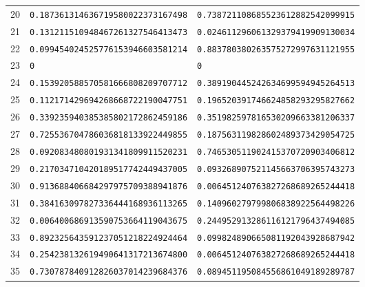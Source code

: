 \begin{center}
\begin{tabular}{@{}rll@{}}
20 & \texttt{0.187361314636719580022373167498} & \texttt{0.738721108685523612882542099915}\\
21 & \texttt{0.131211510948467261327546413473} & \texttt{0.024611296061329379419909130034}\\
22 & \texttt{0.099454024525776153946603581214} & \texttt{0.883780380263575272997631121955}\\
23 & \texttt{0} & \texttt{0}\\
24 & \texttt{0.153920588570581666808209707712} & \texttt{0.389190445242634699594945264513}\\
25 & \texttt{0.112171429694268668722190047751} & \texttt{0.196520391746624858293295827662}\\
26 & \texttt{0.339235940385385802172862459186} & \texttt{0.351982597816530209663381206337}\\
27 & \texttt{0.725536704786036818133922449855} & \texttt{0.187563119828602489373429054725}\\
28 & \texttt{0.092083480801931341809911520231} & \texttt{0.746530511902415370720903406812}\\
29 & \texttt{0.217034710420189517742449437005} & \texttt{0.093268907521145663706395743273}\\
30 & \texttt{0.913688406684297975709388941876} & \texttt{0.006451240763827268689265244418}\\
31 & \texttt{0.384163097827336444168936113265} & \texttt{0.140960279799806838922564498226}\\
32 & \texttt{0.006400686913590753664119043675} & \texttt{0.244952913286116121796437494085}\\
33 & \texttt{0.892325643591237051218224924464} & \texttt{0.099824890665081192043928687942}\\
34 & \texttt{0.254238132619490641317213674800} & \texttt{0.006451240763827268689265244418}\\
35 & \texttt{0.730787840912826037014239684376} & \texttt{0.089451195084556861049189289787}\\
\bottomrule
\end{tabular}
\end{center}

